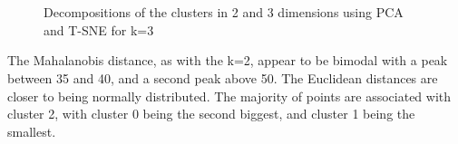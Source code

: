 \begin{figure}[H]
	\centering
	\\
	\\
	\caption{Decompositions of the clusters in 2 and 3 dimensions using PCA and T-SNE for k=3}
	\label{fig:k3pca}
\end{figure}
The Mahalanobis distance, as with the k=2, appear to be bimodal with a peak between 35 and 40, and a second peak above 50. The Euclidean distances are closer to being normally distributed. The majority of points are associated with cluster 2, with cluster 0 being the second biggest, and cluster 1 being the smallest.  


